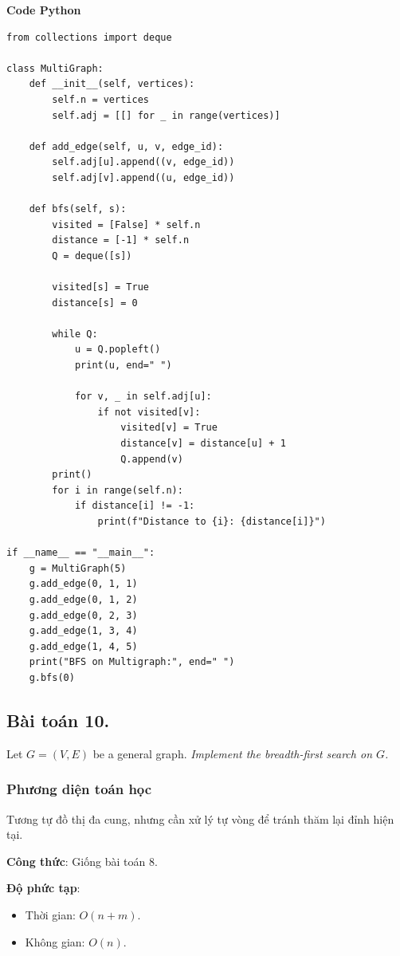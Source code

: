 \documentclass[a4paper,12pt]{article}
\begin{document}
\textbf{Code Python}
\lstset{language=Python}
\begin{lstlisting}
from collections import deque

class MultiGraph:
    def __init__(self, vertices):
        self.n = vertices
        self.adj = [[] for _ in range(vertices)]

    def add_edge(self, u, v, edge_id):
        self.adj[u].append((v, edge_id))
        self.adj[v].append((u, edge_id))

    def bfs(self, s):
        visited = [False] * self.n
        distance = [-1] * self.n
        Q = deque([s])

        visited[s] = True
        distance[s] = 0

        while Q:
            u = Q.popleft()
            print(u, end=" ")

            for v, _ in self.adj[u]:
                if not visited[v]:
                    visited[v] = True
                    distance[v] = distance[u] + 1
                    Q.append(v)
        print()
        for i in range(self.n):
            if distance[i] != -1:
                print(f"Distance to {i}: {distance[i]}")

if __name__ == "__main__":
    g = MultiGraph(5)
    g.add_edge(0, 1, 1)
    g.add_edge(0, 1, 2)
    g.add_edge(0, 2, 3)
    g.add_edge(1, 3, 4)
    g.add_edge(1, 4, 5)
    print("BFS on Multigraph:", end=" ")
    g.bfs(0)
\end{lstlisting}

\subsection{Bài toán 10.} Let $G = (V, E)$ be a general graph. \textit{Implement the breadth-first search on $G$.}

\subsubsection{Phương diện toán học}
Tương tự đồ thị đa cung, nhưng cần xử lý tự vòng để tránh thăm lại đỉnh hiện tại.

\textbf{Công thức}: Giống bài toán 8.

\textbf{Độ phức tạp}: 
\begin{itemize}
    \item Thời gian: \( O(n + m) \).
    \item Không gian: \( O(n) \).
\end{itemize}
\end{document}
